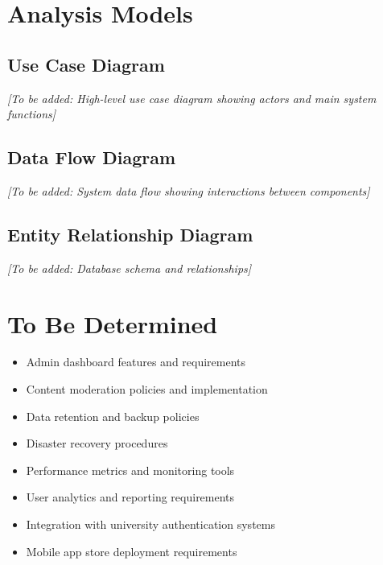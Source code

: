 \documentclass[12pt,a4paper]{article}
\begin{document}
\section{Analysis Models}
\subsection{Use Case Diagram}
\textit{[To be added: High-level use case diagram showing actors and main system functions]}

\subsection{Data Flow Diagram}
\textit{[To be added: System data flow showing interactions between components]}

\subsection{Entity Relationship Diagram}
\textit{[To be added: Database schema and relationships]}

\section{To Be Determined}
\begin{itemize}
    \item Admin dashboard features and requirements
    \item Content moderation policies and implementation
    \item Data retention and backup policies
    \item Disaster recovery procedures
    \item Performance metrics and monitoring tools
    \item User analytics and reporting requirements
    \item Integration with university authentication systems
    \item Mobile app store deployment requirements
\end{itemize}
\end{document}
